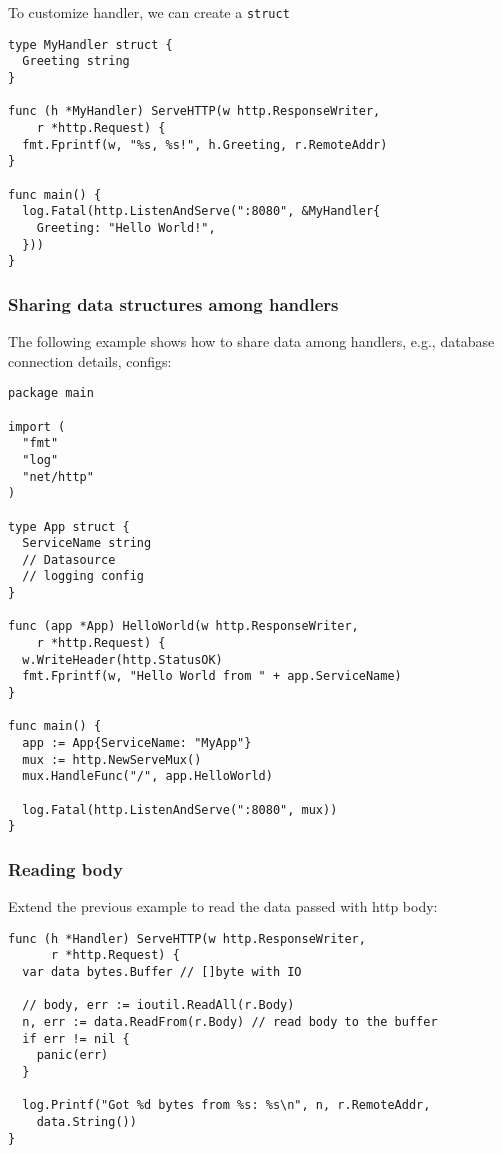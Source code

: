 \documentclass[11pt, letterpaper]{article}
\begin{document}
To customize handler, we can create a \verb|struct|

\begin{verbatim}
type MyHandler struct {
  Greeting string
}

func (h *MyHandler) ServeHTTP(w http.ResponseWriter,
    r *http.Request) {
  fmt.Fprintf(w, "%s, %s!", h.Greeting, r.RemoteAddr)
}

func main() {
  log.Fatal(http.ListenAndServe(":8080", &MyHandler{
    Greeting: "Hello World!",
  }))
}
\end{verbatim}

\subsubsection{Sharing data structures among handlers}

The following example shows how to share data among handlers, e.g., database connection details, configs:

\begin{verbatim}
package main

import (
  "fmt"
  "log"
  "net/http"
)

type App struct {
  ServiceName string
  // Datasource
  // logging config
}

func (app *App) HelloWorld(w http.ResponseWriter,
    r *http.Request) {
  w.WriteHeader(http.StatusOK)
  fmt.Fprintf(w, "Hello World from " + app.ServiceName)
}

func main() {
  app := App{ServiceName: "MyApp"}
  mux := http.NewServeMux()
  mux.HandleFunc("/", app.HelloWorld)

  log.Fatal(http.ListenAndServe(":8080", mux))
}
\end{verbatim}

\subsubsection{Reading body}

Extend the previous example to read the data passed with http body:

\begin{verbatim}
func (h *Handler) ServeHTTP(w http.ResponseWriter,
      r *http.Request) {
  var data bytes.Buffer // []byte with IO
  
  // body, err := ioutil.ReadAll(r.Body)
  n, err := data.ReadFrom(r.Body) // read body to the buffer
  if err != nil {  
    panic(err) 
  }

  log.Printf("Got %d bytes from %s: %s\n", n, r.RemoteAddr,
    data.String())
}
\end{verbatim}
\end{document}
